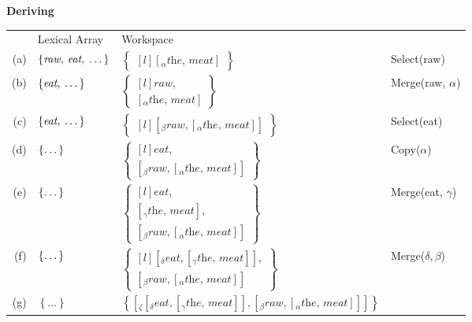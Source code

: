 \documentclass[letterpaper,12pt]{article}
\begin{document}
\begin{minipage}[t]{\textwidth}
  \textbf{Deriving \LLast}\\
  {\small
\begin{tabular}[t]{rlll}
  & Lexical Array & Workspace\\
  (a) & 
  $\left\{ \textit{raw, eat, \dots} \right\}$ &
  $
  \begin{Bmatrix*}[l]
   \left[_\alpha \textit{the, meat} \right] 
  \end{Bmatrix*}
  $
   &
  Select(raw)\\
  (b) &
  $\left\{ \textit{eat, \dots} \right\}$ &
  $\begin{Bmatrix*}[l]
    \textit{raw},\\
    \left[_\alpha\textit{the, meat}\right]
  \end{Bmatrix*}$ 
  &
  Merge(raw, $\alpha$)\\
  (c) &
  $\left\{  \textit{eat, \dots}\right\}$ &
  $
  \begin{Bmatrix*}[l]
    \left[_\beta \textit{raw}, \left[_\alpha\textit{the, meat}\right] \right]
  \end{Bmatrix*}
    $ &
  Select(eat)\\
  (d) &
  $\left\{ \textit{\dots} \right\}$ &
  $
  \begin{Bmatrix*}[l]
    \textit{eat},\\ 
    \left[_\beta \textit{raw}, \left[_\alpha\textit{the, meat}\right] \right]
  \end{Bmatrix*}
  $ &
  Copy($\alpha$)\\
  (e) &
  $\left\{ \textit{\dots} \right\}$ &
  $
  \begin{Bmatrix*}[l]
    \textit{eat},\\
    \left[_\gamma\textit{the, meat}\right],\\
    \left[_\beta \textit{raw}, \left[_\alpha\textit{the, meat}\right] \right]
  \end{Bmatrix*}
  $
    &
  Merge(eat,  $\gamma$)\\
  (f) &
  $\left\{ \textit{\dots} \right\}$ &
  $
  \begin{Bmatrix*}[l]
    \left[_\delta\textit{eat}, \left[_\gamma\textit{the, meat}\right]\right],\\
    \left[_\beta \textit{raw}, \left[_\alpha\textit{the, meat}\right] \right]
  \end{Bmatrix*}
  $ 
  &
  Merge($\delta, \beta$)\\
  (g) &
  $\left\{ \ldots \right\}$ &
  $\left\{  \left[ _\zeta \left[_\delta\textit{eat}, \left[_\gamma\textit{the, meat}\right]\right], \left[_\beta \textit{raw}, \left[_\alpha\textit{the, meat}\right] \right] \right]\right\}$ &
  \\
\end{tabular}}
\end{minipage}
\end{document}
